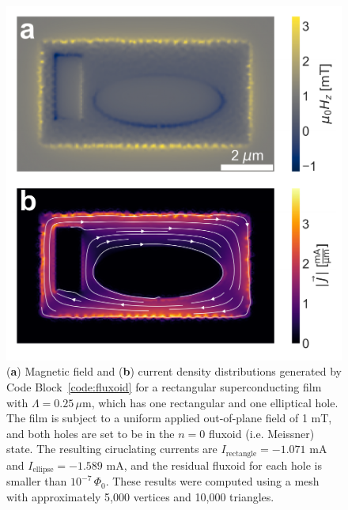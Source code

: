\documentclass[final,3p,times,twocolumn]{elsarticle}
\newcommand{\um}{\mu\mathrm{m}}
\begin{document}
\begin{figure}[t]
    \centering
    \includegraphics[width=\linewidth]{examples/images/fluxoid.pdf}
    \caption{({\bf a}) Magnetic field and ({\bf b}) current density distributions generated by Code Block~\ref{code:fluxoid} for a rectangular superconducting film with $\Lambda=0.25\,\um$, which has one rectangular and one elliptical hole. The film is subject to a uniform applied out-of-plane field of 1 mT, and both holes are set to be in the $n=0$ fluxoid (i.e. Meissner) state. The resulting ciruclating currents are $I_\text{rectangle} = -1.071$ mA and $I_\text{ellipse} = -1.589$ mA, and the residual fluxoid for each hole is smaller than $10^{-7}\,\Phi_0$. These results were computed using a mesh with approximately 5,000 vertices and 10,000 triangles.}
    \label{fig:fluxoid}
\end{figure}
\end{document}

